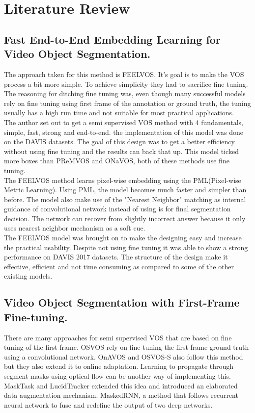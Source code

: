 \documentclass[conference]{IEEEtran}
\begin{document}
\vspace{.5cm}
\section{Literature Review}
\subsection{Fast End-to-End Embedding Learning for Video Object Segmentation.} 
The approach taken for this method is FEELVOS.\cite{voigtlaender2019feelvos} It's goal is to make the VOS process a bit more simple. To achieve simplicity they had to sacrifice fine tuning. The reasoning for ditching fine tuning was, even though many successful models rely on fine tuning using first frame of the annotation or ground truth, the tuning usually has a high run time and not suitable for most practical applications.\\
The author set out to get a semi supervised VOS method with 4 fundamentals, simple, fast, strong and end-to-end. the implementation of this model was done on the DAVIS\cite{binas2017ddd17} datasets. The goal of this design was to get a better efficiency without using fine tuning and the results can back that up. This model ticked more boxes than PReMVOS\cite{luiten2018premvos} and ONaVOS\cite{voigtlaender2017online}, both of these methods use fine tuning.\\
The FEELVOS method learns pixel-wise embedding using the PML\cite{chen2018blazingly}(Pixel-wise Metric Learning). Using PML, the model becomes much faster and simpler than before. The model also make use of the "Nearest Neighbor" matching as internal guidance of convolutional network instead of using is for final segmentation decision. The network can recover from slightly incorrect answer because it only uses nearest neighbor mechanism as a soft cue.\\
The FEELVOS\cite{voigtlaender2019feelvos} model was brought on to make the designing easy and increase the practical usability. Despite not using fine tuning it was able to show a strong performance on DAVIS 2017 datasets. The structure of the design make it effective, efficient and not time consuming as compared to some of the other existing models.
\subsection{Video Object Segmentation with First-Frame Fine-tuning.} There are many approaches for semi supervised VOS that are based on fine tuning of the first frame. OSVOS\cite{caelles2017one} rely on fine tuning the first frame ground truth using a convolutional network. OnAVOS\cite{voigtlaender2017online} and OSVOS-S\cite{maninis2018video} also follow this method but they also extend it to online adaptation. Learning to propagate through segment masks using optical flow can be another way of implementing this. MaskTask\cite{koike2020learning} and LucidTracker\cite{khoreva2017lucid} extended this idea and introduced an elaborated data augmentation mechanism. MaskedRNN\cite{hu2017maskrnn}, a method that follows recurrent neural network to fuse and redefine the output of two deep networks. 
\end{document}
